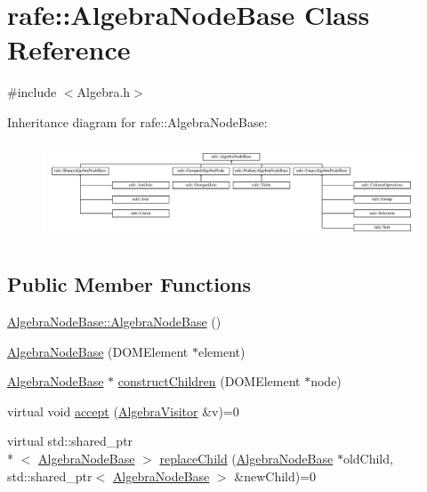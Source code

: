 \hypertarget{classrafe_1_1_algebra_node_base}{\section{rafe\+:\+:Algebra\+Node\+Base Class Reference}
\label{classrafe_1_1_algebra_node_base}
}


{\ttfamily \#include $<$Algebra.\+h$>$}

Inheritance diagram for rafe\+:\+:Algebra\+Node\+Base\+:\begin{figure}[H]
\begin{center}
\leavevmode
\includegraphics[height=2.901554cm]{classrafe_1_1_algebra_node_base}
\end{center}
\end{figure}
\subsection*{Public Member Functions}
\begin{DoxyCompactItemize}
\item 
\hyperlink{classrafe_1_1_algebra_node_base_a957999660bd1554dbfbc14ffaac4b8fe}{Algebra\+Node\+Base\+::\+Algebra\+Node\+Base} ()
\item 
\hyperlink{classrafe_1_1_algebra_node_base_a34676ea35550f991e09a646960ee98d0}{Algebra\+Node\+Base} (D\+O\+M\+Element $\ast$element)
\item 
\hyperlink{classrafe_1_1_algebra_node_base}{Algebra\+Node\+Base} $\ast$ \hyperlink{classrafe_1_1_algebra_node_base_a05bda55332729249965d5c09377e201f}{construct\+Children} (D\+O\+M\+Element $\ast$node)
\item 
virtual void \hyperlink{classrafe_1_1_algebra_node_base_a48e59b55cdb1c3d108343eb18920c1d1}{accept} (\hyperlink{classrafe_1_1_algebra_visitor}{Algebra\+Visitor} \&v)=0
\item 
virtual std\+::shared\+\_\+ptr\\*
$<$ \hyperlink{classrafe_1_1_algebra_node_base}{Algebra\+Node\+Base} $>$ \hyperlink{classrafe_1_1_algebra_node_base_ac6d722e739dd39c223bb129dfbd0ab45}{replace\+Child} (\hyperlink{classrafe_1_1_algebra_node_base}{Algebra\+Node\+Base} $\ast$old\+Child, std\+::shared\+\_\+ptr$<$ \hyperlink{classrafe_1_1_algebra_node_base}{Algebra\+Node\+Base} $>$ \&new\+Child)=0
\end{DoxyCompactItemize}
